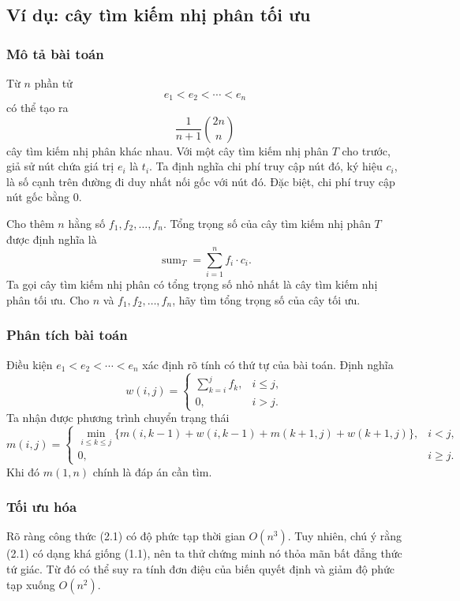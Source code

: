 \documentclass[11pt]{article}
\begin{document}
\subsection*{Ví dụ: cây tìm kiếm nhị phân tối ưu}

\subsubsection*{Mô tả bài toán}

Từ $n$ phần tử
\[
  e_1<e_2<\cdots<e_n
\]
có thể tạo ra
\[
  \frac{1}{n+1}\binom{2n}{n}
\]
cây tìm kiếm nhị phân khác nhau. Với một cây tìm kiếm nhị phân $T$ cho trước,
giả sử nút chứa giá trị $e_i$ là $t_i$. Ta định nghĩa chi phí truy cập nút đó,
ký hiệu $c_i$, là số cạnh trên đường đi duy nhất nối gốc với nút đó. Đặc biệt,
chi phí truy cập nút gốc bằng $0$.

Cho thêm $n$ hằng số $f_1,f_2,\ldots,f_n$. Tổng trọng số của cây tìm kiếm nhị
phân $T$ được định nghĩa là
\[
  \operatorname{sum}_T=\sum_{i=1}^{n} f_i\cdot c_i.
\]
Ta gọi cây tìm kiếm nhị phân có tổng trọng số nhỏ nhất là cây tìm kiếm nhị
phân tối ưu. Cho $n$ và $f_1,f_2,\ldots,f_n$, hãy tìm tổng trọng số của cây
tối ưu.

\subsubsection*{Phân tích bài toán}

Điều kiện $e_1<e_2<\cdots<e_n$ xác định rõ tính có thứ tự của bài toán. Định
nghĩa
\[
  w(i,j)=
  \begin{cases}
    \displaystyle \sum_{k=i}^{j} f_k, & i\le j,\\[0.6em]
    0, & i>j.
  \end{cases}
\]
Ta nhận được phương trình chuyển trạng thái
\[
  m(i,j)=
  \begin{cases}
    \displaystyle
    \min_{i\le k\le j}
      \{m(i,k-1)+w(i,k-1)+m(k+1,j)+w(k+1,j)\}, & i<j,\\[0.8em]
    0, & i\ge j.
  \end{cases}
  \tag{2.1}
\]
Khi đó $m(1,n)$ chính là đáp án cần tìm.

\subsubsection*{Tối ưu hóa}

Rõ ràng công thức (2.1) có độ phức tạp thời gian $O(n^3)$. Tuy nhiên, chú ý
rằng (2.1) có dạng khá giống (1.1), nên ta thử chứng minh nó thỏa mãn bất
đẳng thức tứ giác. Từ đó có thể suy ra tính đơn điệu của biến quyết định và
giảm độ phức tạp xuống $O(n^2)$.
\end{document}
